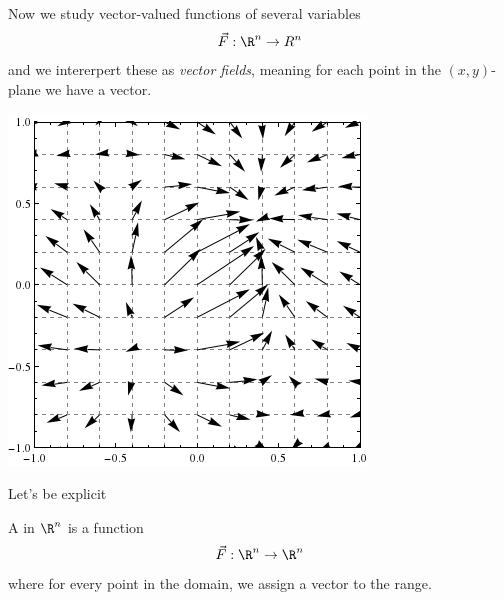 \documentclass{ximera}
\begin{document}
Now we study vector-valued functions of several variables
\[
\vec{F}:\R^n\to R^n
\]
and we intererpert these as \textit{vector fields}, meaning for each
point in the $(x,y)$-plane we have a vector.
\begin{image}
  \includegraphics{egField.png}
\end{image}


Let's be explicit
\begin{definition}
  A  in $\R^n$ is a function
  \[
  \vec{F}: \R^n\to\R^n
  \]
  where for every point in the domain, we assign a vector to the range. 
\end{definition}
\end{document}
